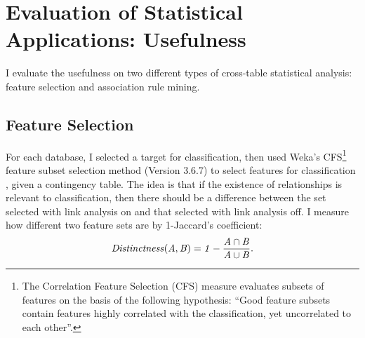 \documentclass{sfuthesis}
\begin{document}
\section{Evaluation of Statistical Applications: Usefulness}
I evaluate the usefulness on two different types of cross-table statistical analysis: feature selection and association rule  mining.%

\subsection{Feature Selection} 
For each database, I  selected a target for classification, then used Weka's CFS\footnote{The Correlation Feature Selection (CFS) measure evaluates subsets of features on the basis of the following hypothesis: ``Good feature subsets contain features highly correlated with the classification, yet uncorrelated to each other''\cite{Hall1999}.} feature subset selection method (Version 3.6.7) to select features for classification \cite{Hall2009}, given a contingency table. The idea is that if the existence of relationships is relevant to classification, then there should be a difference between the set selected with link analysis on and that selected with link analysis off. 
I  measure how different two feature sets are by 1-Jaccard's coefficient:
$$\it{Distinctness}(A,B) = 1- \frac{A \cap B}{A \cup B}.$$

\begin{table}[!h] \centering
\caption{Selected Features for Target variables for  Link Analysis Off vs. Link Analysis On. Rvars denotes the number of relationship features selected. 
\label{table:feature-select}}

\end{table}
\end{document}
